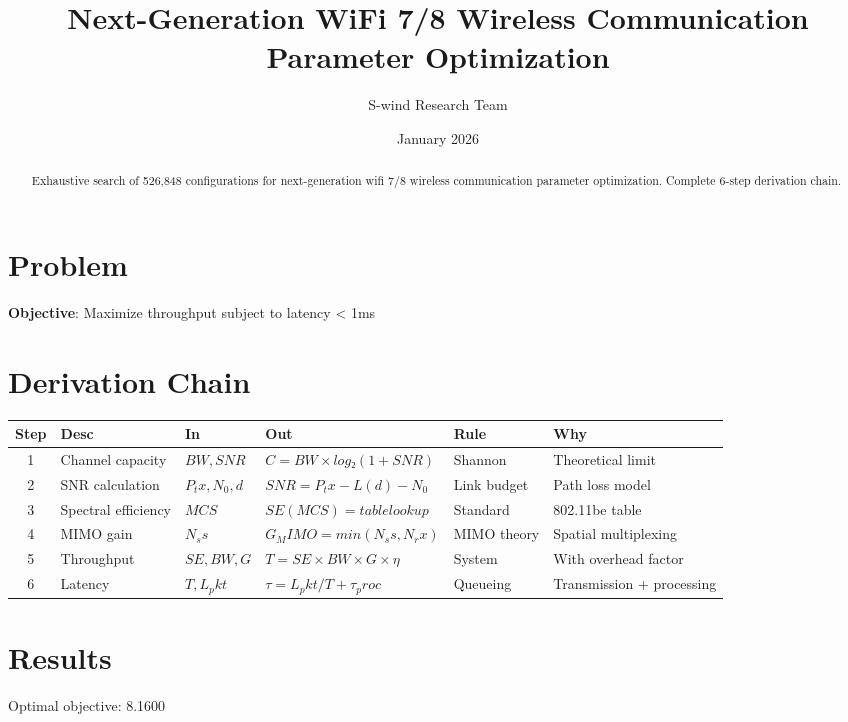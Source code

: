 \documentclass[11pt]{article}
\title{Next-Generation WiFi 7/8 Wireless Communication Parameter Optimization}
\author{S-wind Research Team}
\date{January 2026}
\begin{document}
\maketitle

\begin{abstract}
Exhaustive search of 526,848 configurations for next-generation wifi 7/8 wireless communication parameter optimization. Complete 6-step derivation chain.
\end{abstract}

\section{Problem}
\textbf{Objective}: Maximize throughput subject to latency < 1ms

\section{Derivation Chain}
\begin{longtable}{|c|p{2cm}|p{2cm}|p{3cm}|p{2cm}|p{3cm}|}
\hline
Step & Desc & In & Out & Rule & Why\\\hline\endhead
1 & Channel capacity & $BW, SNR$ & $C = BW×log₂(1+SNR)$ & Shannon & Theoretical limit\\\hline
2 & SNR calculation & $P_tx, N_0, d$ & $SNR = P_tx - L(d) - N_0$ & Link budget & Path loss model\\\hline
3 & Spectral efficiency & $MCS$ & $SE(MCS) = table lookup$ & Standard & 802.11be table\\\hline
4 & MIMO gain & $N_ss$ & $G_MIMO = min(N_ss, N_rx)$ & MIMO theory & Spatial multiplexing\\\hline
5 & Throughput & $SE, BW, G$ & $T = SE×BW×G×η$ & System & With overhead factor\\\hline
6 & Latency & $T, L_pkt$ & $τ = L_pkt/T + τ_proc$ & Queueing & Transmission + processing\\\hline
\end{longtable}

\section{Results}
Optimal objective: 8.1600
\end{document}
